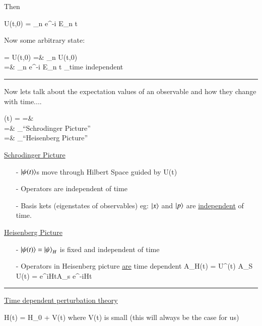 {Then 

\be
U(t,0) = \sum\limits_{n} e^{-i E_n t} 
\ee


Now some arbitrary state:

\bea
{} = U(t,0) =&  \sum\limits_{n} U(t,0)  \\
                                    =&  \sum\limits_{n}  e^{-i E_n t} _{\textrm{time independent}} \\
\eea


\noindent\rule{\textwidth}{1pt}

Now lets talk about the expectation values of an observable and how they change with time....


\bea
{}(t) =  =& \\
              =& _{\textrm{``Schrodinger Picture''}} \\
              =& _{\textrm{``Heisenberg Picture''}} 
\eea


\underline{Schrodinger Picture}
\begin{itemize}
\item[-] $\ket{\psi(t)}$s move through Hilbert Space guided by U(t)
\item[-] Operators are independent of time
\item[-] Basis kets (eigenstates of observables) eg: $\ket{x}$ and $\ket{p}$ are \underline{independent} of time.
\end{itemize}



\underline{Heisenberg Picture}
\begin{itemize}
\item[-] $\ket{\psi(t)} = \ket{\psi}_H$ is fixed and independent of time
\item[-] {Operators in Heisenberg picture \underline{are} time dependent 
\be
A_H(t) = U^\dagger(t) A_S U(t) = e^{iHt}A_s e^{-iHt}
\ee
}
\end{itemize}

\noindent\rule{\textwidth}{1pt}

\underline{Time dependent perturbation theory}

\be
H(t) = H_0 + V(t)
\ee
where V(t) is small (this will always be the case for us)

}
